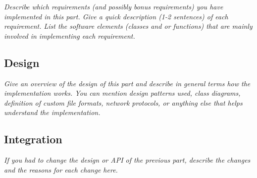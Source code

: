 \documentclass[JCDReport.tex]{subfiles}
\begin{document}
\emph{Describe which requirements (and possibly bonus requirements) you have implemented in this part. Give a quick description (1-2 sentences) of each requirement. List the software elements (classes and or functions) that are mainly involved in implementing each requirement.}


\subsection{Design}

\emph{Give an overview of the design of this part and describe in general terms how the implementation works. You can mention design patterns used, class diagrams, definition of custom file formats, network protocols, or anything else that helps understand the implementation.}


\subsection{Integration}

\emph{If you had to change the design or API of the previous part, describe the changes and the reasons for each change here.}
\end{document}
